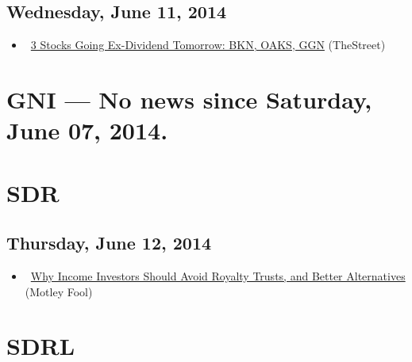 \documentclass[11pt,asymmetric]{article}
\begin{document}
\subsection*{Wednesday, June 11, 2014}
\begin{itemize}
\item\ \href{http://www.thestreet.com/story/12741051/1/3-stocks-going-ex-dividend-tomorrow-bkn-oaks-ggn.html?puc=yahoo&cm_ven=YAHOO}{3 Stocks Going Ex-Dividend Tomorrow: BKN, OAKS, GGN} (TheStreet)
\end{itemize}

\section*{GNI --- No news since Saturday, June 07, 2014.}


\section*{SDR}

\subsection*{Thursday, June 12, 2014}
\begin{itemize}
\item\ \href{http://www.fool.com/investing/general/2014/06/11/why-income-investors-should-avoid-royalty-trusts-a.aspx?source=eogyholnk0000001}{Why Income Investors Should Avoid Royalty Trusts, and Better Alternatives} (Motley Fool)
\end{itemize}

\section*{SDRL}
\end{document}
